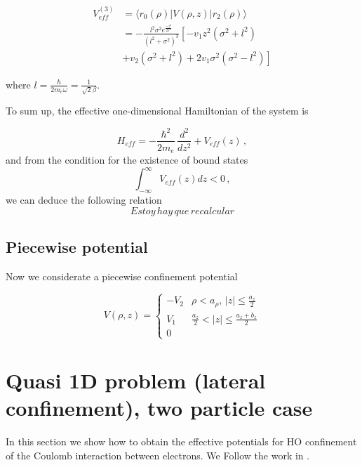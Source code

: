 \documentclass[a4paper,10pt]{article}
\begin{document}
\begin{equation}
  \begin{split}
    V_{eff}^{(3)} &= \langle r_0(\rho) \lvert V(\rho,z) \lvert r_2(\rho) \rangle \\
    &= -\frac{l^2\sigma^2 e^{\frac{-z^2}{2\sigma^2}}}{(l^2+\sigma^2)^3} \left[-v_1 z^2\left(\sigma^2 + l^2\right) \right.\\
    &\left.+ v_2 \left(\sigma^2 + l^2\right) + 2v_1\sigma^2 \left(\sigma^2 - l^2 \right) \right]
  \end{split}
\end{equation}

\noindent where $l = \frac{\hbar}{2 m_e \omega} = \frac{1}{\sqrt{2}\beta}$.

To sum up, the effective one-dimensional Hamiltonian of the system is

\begin{equation}
  H_{eff} = -\frac{\hbar^2}{2 m_e}\,\frac{d^2}{dz^2} + V_{eff}(z)\,,
\end{equation}
\noindent and from the condition for the existence of bound states
\begin{equation}
  \int_{-\infty}^{\infty} V_{eff}(z) dz < 0\,,
\end{equation}
\noindent we can deduce the following relation
\begin{equation}
  Estoy\, hay\, que\, recalcular
\end{equation}

\subsection*{Piecewise potential}
Now we considerate a piecewise confinement potential

\begin{equation}
  V(\rho, z) = \left\{ \begin{matrix}
                         -V_2 & \rho<a_{\rho},\, |z|\leq\frac{a_z}{2} \\
                         V_1  & \frac{a_z}{2}< |z| \leq \frac{a_z + b_z}{2}\\
                         0
                       \end{matrix}\right.
\end{equation}

\section*{Quasi 1D problem (lateral confinement), two particle case}
In this section we show how to obtain the effective potentials for HO confinement of the
Coulomb interaction between electrons. We Follow the work
in \cite{bednarek_effective_2003}.
\end{document}
